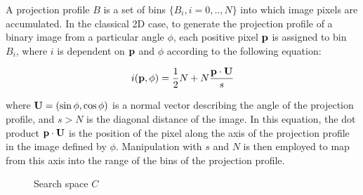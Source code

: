 A projection profile $B$ is a set of bins $\{B_i, i=0,..,N\}$ into which image pixels are accumulated.
In the classical 2D case,
to generate the projection profile of a binary image from a particular angle $\phi$, each
positive pixel ${ \bf p }$ is assigned to bin $B_i$, where $i$ is dependent on
${ \bf p }$ and $\phi$ according to the following equation:

\begin{equation} \label{classicproj} i({ \bf p },\phi) = \frac{1}{2} N + N \frac{ { \bf p } \cdot { \bf U } }{ s } \end{equation}

{ \parindent 0mm
where ${ \bf U }=(\sin \phi,\cos \phi)$ is a normal vector describing the
angle of the projection profile, and $s>N$ is the diagonal distance
of the image.
In this equation, the dot product ${ \bf p } \cdot { \bf U }$ is the position
of the pixel along the axis of the projection profile in the image
defined by $\phi$.
Manipulation with $s$ and $N$ is then employed to map from this axis
into the range of the bins of the projection profile.
}

\begin{comment}
\begin{figure}[t]
\centering
\begin{center}
\subfigure[The winning projection profile (white cross below)]{\epsfig{figure=images/image29001bestpp.ps,width=35mm}\label{bestpp}}
\subfigure[An example of a poor projection profile (black cross below)]{\epsfig{figure=images/image29001poorpp.ps,width=35mm}\label{poorpp}}
\\
\subfigure[Scores for all projection profiles]{\epsfig{figure=images/image29001ppmap.ps,width=50mm}\label{ppmap}}
\end{center}
\caption{Projection profiles generated from \reffig{runbin}}
\label{pps}
\end{figure}
\end{comment}

\begin{figure}[t]
\centering
\begin{center}
% 
\hspace{5mm}
\end{center}
\vspace*{-5mm}
\caption{Search space $C$}
\label{searchspace}
\end{figure}

